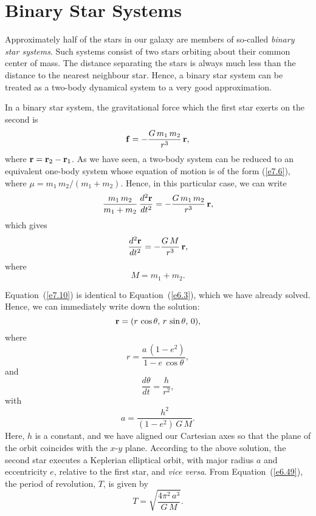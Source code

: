 \section{Binary Star Systems}\label{sbin}
Approximately half of the stars in our galaxy are members of so-called {\em binary star
systems}. Such systems consist of two stars orbiting about their common
center of mass. The distance separating the  stars is always  much less than
the distance to the nearest neighbour star. Hence, a binary star system
can be treated as a two-body dynamical system to a very good approximation.

In a binary star system, the gravitational force which the first star exerts on
the second is
\begin{equation}
{\bf f} = - \frac{G\,m_1\,m_2}{r^3}\,{\bf r},
\end{equation}
where ${\bf r}= {\bf r}_2-{\bf r}_1$.
As we have seen, a two-body system can be reduced to an equivalent
one-body system whose equation of motion is of the form (\ref{e7.6}),
where $\mu= m_1\,m_2/(m_1+m_2)$. 
Hence, in this particular case, we can write
\begin{equation}
\frac{m_1\,m_2}{m_1+m_2}\, \frac{d^2{\bf r}}{dt^2} =-
\frac{G\,m_1\,m_2}{r^3} \,{\bf r},
\end{equation}
which gives
\begin{equation}\label{e7.10}
\frac{d^2{\bf r}}{dt^2} =-
\frac{G\,M}{r^3} \,{\bf r},
\end{equation}
where
\begin{equation}
M = m_1+ m_2.
\end{equation}

Equation~(\ref{e7.10}) is identical to Equation~(\ref{e6.3}), which we have already
solved. Hence, we can immediately write down the solution:
\begin{equation}
{\bf r} = (r\,\cos\theta,\,r\,\sin\theta,\, 0),
\end{equation}
where
\begin{equation}
 r = \frac{a\,(1-e^2)}{1-e\,\cos\theta},
\end{equation}
and
\begin{equation}
\frac{d\theta}{dt} = \frac{h}{r^2},
\end{equation}
with
\begin{equation}
a = \frac{h^2}{(1-e^2)\,G\,M}.
\end{equation}
Here, $h$ is a constant, and we have aligned our Cartesian axes so that the plane of the orbit
coincides with the $x$-$y$ plane.
According to the above solution, the second star executes a Keplerian
elliptical orbit, with major radius $a$ and eccentricity $e$,
relative to the first star, and {\em vice versa}. From Equation~(\ref{e6.49}), the period of revolution, $T$, is given by
\begin{equation}\label{e7.18}
T = \sqrt{\frac{4\pi^2\,a^3}{G\,M}}.
\end{equation}

